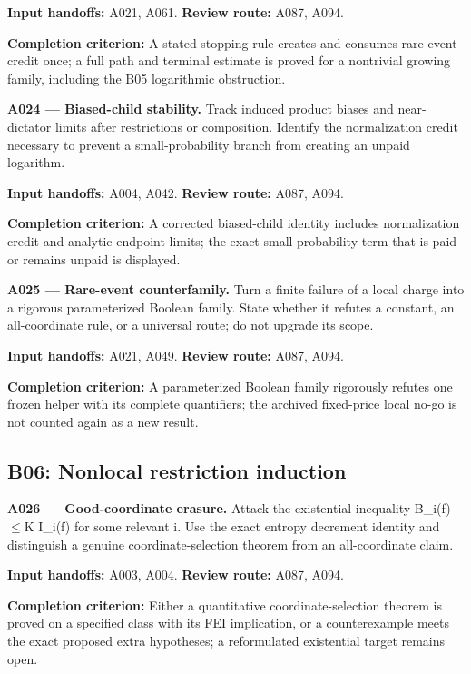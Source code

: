 \documentclass[11pt]{article}
\begin{document}
{\small\color{ink}\textbf{Input handoffs:} A021, A061. \textbf{Review route:} A087, A094.\par
\textbf{Completion criterion:} A stated stopping rule creates and consumes rare-event credit once; a full path and terminal estimate is proved for a nontrivial growing family, including the B05 logarithmic obstruction.\par}



\textbf{A024 --- Biased-child stability.} Track induced product biases and near-dictator limits after restrictions or composition. Identify the normalization credit necessary to prevent a small-probability branch from creating an unpaid logarithm.

{\small\color{ink}\textbf{Input handoffs:} A004, A042. \textbf{Review route:} A087, A094.\par
\textbf{Completion criterion:} A corrected biased-child identity includes normalization credit and analytic endpoint limits; the exact small-probability term that is paid or remains unpaid is displayed.\par}



\textbf{A025 --- Rare-event counterfamily.} Turn a finite failure of a local charge into a rigorous parameterized Boolean family. State whether it refutes a constant, an all-coordinate rule, or a universal route; do not upgrade its scope.

{\small\color{ink}\textbf{Input handoffs:} A021, A049. \textbf{Review route:} A087, A094.\par
\textbf{Completion criterion:} A parameterized Boolean family rigorously refutes one frozen helper with its complete quantifiers; the archived fixed-price local no-go is not counted again as a new result.\par}



\subsection{B06: Nonlocal restriction induction}

\textbf{A026 --- Good-coordinate erasure.} Attack the existential inequality B\_i(f)$\le$K I\_i(f) for some relevant i. Use the exact entropy decrement identity and distinguish a genuine coordinate-selection theorem from an all-coordinate claim.

{\small\color{ink}\textbf{Input handoffs:} A003, A004. \textbf{Review route:} A087, A094.\par
\textbf{Completion criterion:} Either a quantitative coordinate-selection theorem is proved on a specified class with its FEI implication, or a counterexample meets the exact proposed extra hypotheses; a reformulated existential target remains open.\par}
\end{document}
